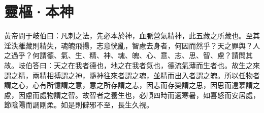 \documentclass[12pt]{ctexbook}
\begin{document}
\section{靈樞·本神}%


\begin{yuanwen}
黃帝問于岐伯曰：凡刺之法，先必本於神，血脈營氣精神，此五藏之所藏也。至其淫泆離藏則精失，魂魄飛揚，志意恍亂，智慮去身者，何因而然乎？天之罪舆？人之過乎？何謂德、氣、生、精、神、魂、魄、心、意、志、思、智、慮？請問其故。岐伯答曰：天之在我者德也，地之在我者氣也，德流氣薄而生者也。故生之來謂之精，兩精相搏謂之神，隨神往來者謂之魂，並精而出入者謂之魄。所以任物者謂之心，心有所憶謂之意，意之所存謂之志，因志而存變謂之思，因思而遠慕謂之慮，因慮而處物謂之智。故智者之養生也，必順四時而適寒暑，如喜怒而安居處，節陰陽而調剛柔。如是則僻邪不至，長生久視。
\end{yuanwen}

\end{document}
